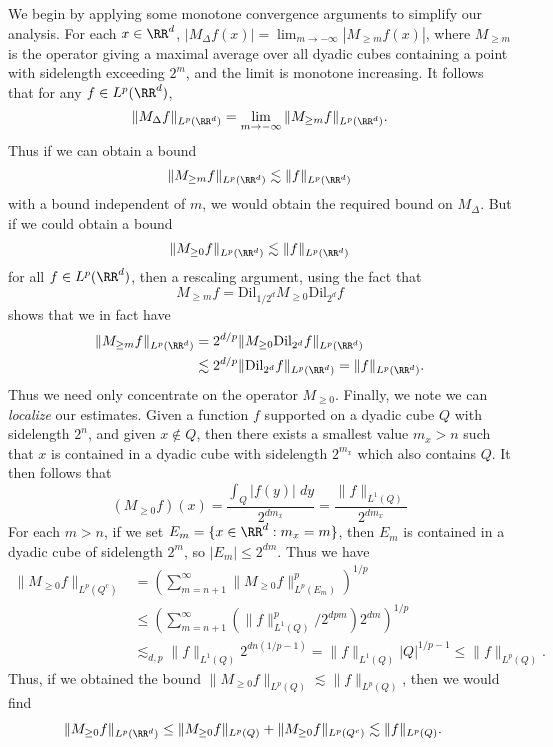We begin by applying some monotone convergence arguments to simplify our analysis. For each $x \in \RR^d$, $|M_\Delta f(x)| = \lim_{m \to -\infty} |M_{\geq m} f(x)|$, where $M_{\geq m}$ is the operator giving a maximal average over all dyadic cubes containing a point with sidelength exceeding $2^m$, and the limit is monotone increasing. It follows that for any $f \in L^p(\RR^d)$,
%
\[ \| M_\Delta f \|_{L^p(\RR^d)} = \lim_{m \to -\infty} \| M_{\geq m} f \|_{L^p(\RR^d)}. \]
%
Thus if we can obtain a bound
%
\[ \| M_{\geq m} f \|_{L^p(\RR^d)} \lesssim \| f \|_{L^p(\RR^d)} \]
%
with a bound independent of $m$, we would obtain the required bound on $M_\Delta$. But if we could obtain a bound
%
\[ \| M_{\geq 0} f \|_{L^p(\RR^d)} \lesssim \| f \|_{L^p(\RR^d)} \]
%
for all $f \in L^p(\RR^d)$, then a rescaling argument, using the fact that
%
\[ M_{\geq m} f = \text{Dil}_{1/2^d} M_{\geq 0} \text{Dil}_{2^d} f \]
%
shows that we in fact have
%
\begin{align*}
  \| M_{\geq m} f \|_{L^p(\RR^d)} &= 2^{d/p} \| M_{\geq 0} \text{Dil}_{2^d} f \|_{L^p(\RR^d)}\\
  &\lesssim 2^{d/p} \| \text{Dil}_{2^d} f \|_{L^p(\RR^d)} = \| f \|_{L^p(\RR^d)}.
\end{align*}
%
Thus we need only concentrate on the operator $M_{\geq 0}$. Finally, we note we can \emph{localize} our estimates. Given a function $f$ supported on a dyadic cube $Q$ with sidelength $2^n$, and given $x \not \in Q$, then there exists a smallest value $m_x > n$ such that $x$ is contained in a dyadic cube with sidelength $2^{m_x}$ which also contains $Q$. It then follows that
%
\[ (M_{\geq 0} f)(x) = \frac{\int_Q |f(y)|\; dy}{2^{dm_x}} = \frac{\| f \|_{L^1(Q)}}{2^{dm_x}} \]
%
For each $m > n$, if we set $E_m = \{ x \in \RR^d: m_x = m \}$, then $E_m$ is contained in a dyadic cube of sidelength $2^m$, so $|E_m| \leq 2^{dm}$. Thus we have
%
\begin{align*}
  \| M_{\geq 0} f \|_{L^p(Q^c)} &= \left( \sum_{m = n+1}^\infty \| M_{\geq 0} f \|_{L^p(E_m)}^p \right)^{1/p}\\
  &\leq \left( \sum_{m = n+1}^\infty \left( \| f \|_{L^1(Q)}^p / 2^{dpm} \right) 2^{dm} \right)^{1/p}\\
  &\lesssim_{d,p} \| f \|_{L^1(Q)} 2^{dn(1/p - 1)} = \| f \|_{L^1(Q)} |Q|^{1/p-1} \leq \| f \|_{L^p(Q)}.
\end{align*}
%
Thus, if we obtained the bound $\| M_{\geq 0} f \|_{L^p(Q)} \lesssim \| f \|_{L^p(Q)}$, then we would find
%
\begin{align*}
  \| M_{\geq 0} f \|_{L^p(\RR^d)} &\leq \| M_{\geq 0} f \|_{L^p(Q)} + \| M_{\geq 0} f \|_{L^p(Q^c)} \lesssim \| f \|_{L^p(Q)}.
\end{align*}
